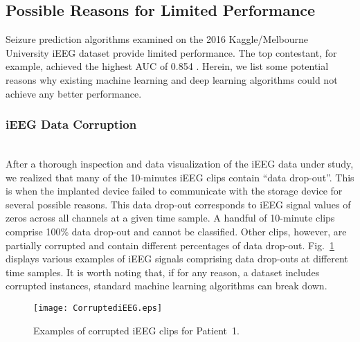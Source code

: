 \documentclass[journal]{IEEEtran}
\begin{document}
\subsection{Possible Reasons for Limited Performance}

Seizure prediction algorithms examined on the 2016 Kaggle/Melbourne University iEEG dataset provide limited performance. The top contestant, for example, achieved the highest AUC of 0.854 \cite{kuhlmann2018epilepsyecosystem, WinningSolution}. Herein, we list some potential reasons why existing machine learning and deep learning algorithms could not achieve any better performance.



\subsubsection{iEEG Data Corruption}~\\
After a thorough inspection and data visualization of the iEEG data under study, we realized that many of the 10-minutes iEEG clips contain ``data drop-out''. This is when the implanted device failed to communicate with the storage device for several possible reasons. This data drop-out corresponds to iEEG signal values of zeros across all channels at a given time sample. A handful of 10-minute clips comprise 100\% data drop-out and cannot be classified. Other clips, however, are partially corrupted and contain different percentages of data drop-out. Fig.~\ref{Fig_CorruptediEEG} displays various examples of iEEG signals comprising data drop-outs at different time samples. It is worth noting that, if for any reason, a dataset includes corrupted instances, standard machine learning algorithms can break down.  



\begin{figure}[!t]\centering
	\texttt{[image: CorruptediEEG.eps]}
	\caption{Examples of corrupted iEEG clips for Patient~1.}
	\label{Fig_CorruptediEEG}
\end{figure}
\end{document}
